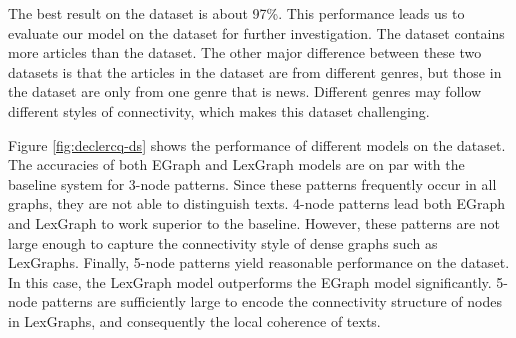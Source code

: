 The best result on the \pitlerds dataset is about 97\%. 
This performance leads us to evaluate our model on the \declercqds dataset for further investigation. 
The \declercqds dataset contains more articles than the \pitlerds dataset. 
The other major difference between these two datasets is that the articles in the \declercqds dataset are from different genres, but those in the \pitlerds dataset are only from one genre that is news.  
Different genres may follow different styles of connectivity, which makes this dataset challenging. 

Figure \ref{fig:declercq-ds} shows the performance of different models on the \declercqds dataset.   
The accuracies of both EGraph and LexGraph models are on par with the baseline system for 3-node patterns. 
Since these patterns frequently occur in all graphs, they are not able to distinguish texts. 
4-node patterns lead both EGraph and LexGraph to work superior to the baseline. 
However, these patterns are not large enough to capture the connectivity style of dense graphs such as LexGraphs. 
Finally, 5-node patterns yield reasonable performance on the \declercqds dataset. 
In this case, the LexGraph model outperforms the EGraph model significantly. 
5-node patterns are sufficiently large to encode the connectivity structure of nodes in LexGraphs, and consequently the local coherence of texts. 




